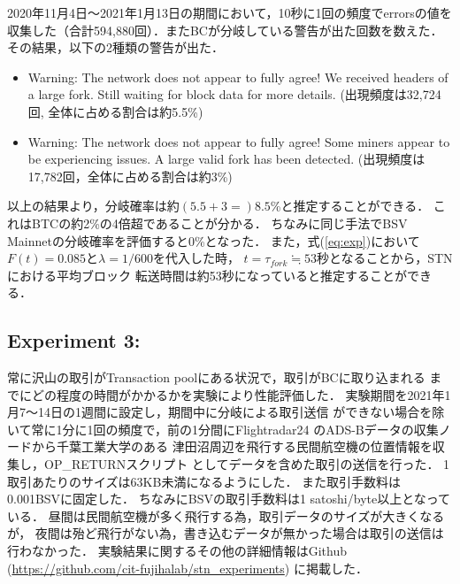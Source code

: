\documentclass[graybox]{svmult}
\begin{document}
2020年11月4日〜2021年1月13日の期間において，10秒に1回の頻度でerrorsの値を
収集した（合計594,880回）．またBCが分岐している警告が出た回数を数えた．
その結果，以下の2種類の警告が出た．
%
\begin{itemize}
  \item Warning: The network does not appear to fully agree! We received
        headers of a large fork. Still waiting for block data for more details.
	(出現頻度は32,724回, 全体に占める割合は約5.5\%)

  \item Warning: The network does not appear to fully agree! Some miners
        appear to be experiencing issues. A large valid fork has been detected. 
	(出現頻度は17,782回，全体に占める割合は約3\%)
\end{itemize}
%
以上の結果より，分岐確率は約$(5.5+3=)8.5$\%と推定することができる．
これはBTCの約2\%の4倍超であることが分かる．
ちなみに同じ手法でBSV Mainnetの分岐確率を評価すると0\%となった．
また，式(\ref{eq:exp})において$F(t)=0.085$と$\lambda=1/600$を代入した時，
$t=\tau_{fork} \fallingdotseq 53$秒となることから，STNにおける平均ブロック
転送時間は約53秒になっていると推定することができる．




\subsection{Experiment 3: }


常に沢山の取引がTransaction poolにある状況で，取引がBCに取り込まれる
までにどの程度の時間がかかるかを実験により性能評価した．
実験期間を2021年1月7〜14日の1週間に設定し，期間中に分岐による取引送信
ができない場合を除いて常に1分に1回の頻度で，前の1分間にFlightradar24 
\cite{flightradar24} のADS-Bデータの収集ノードから千葉工業大学のある
津田沼周辺を飛行する民間航空機の位置情報を収集し，OP\_RETURNスクリプト
としてデータを含めた取引の送信を行った．
1取引あたりのサイズは63KB未満になるようにした．
また取引手数料は0.001BSVに固定した．
ちなみにBSVの取引手数料は1 satoshi/byte以上となっている．
昼間は民間航空機が多く飛行する為，取引データのサイズが大きくなるが，
夜間は殆ど飛行がない為，書き込むデータが無かった場合は取引の送信は
行わなかった．
実験結果に関するその他の詳細情報はGithub 
(\url{https://github.com/cit-fujihalab/stn_experiments})
に掲載した．
\end{document}
